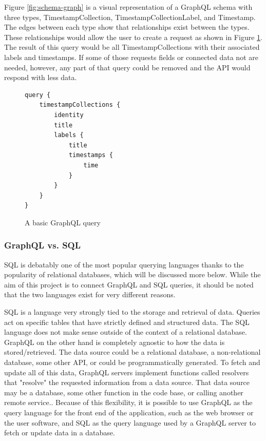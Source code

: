 Figure \ref{fig:schema-graph} is a visual representation of a GraphQL schema with three types, TimestampCollection, TimestampCollectionLabel, and Timestamp.  The edges between each type show that relationships exist between the types. These relationships  would allow the user to create a request as shown in Figure \ref{fig:basic-query}.  The result of this query would be all TimestampCollections with their associated labels and timestamps.  If some of those requests fields or connected data not are needed, however, any part of that query could be removed and the API would respond with less data.

\begin{figure}
    \begin{verbatim}
query {
    timestampCollections {
        identity
        title
        labels {
            title
            timestamps {
                time
            }
        }
    }
}
    \end{verbatim}
    \caption{A basic GraphQL query}
    \label{fig:basic-query}
\end{figure}

\subsubsection{GraphQL vs. SQL}

SQL is debatably one of the most popular querying languages thanks to the popularity of relational databases, which will be discussed more below.  While the aim of this project is to connect GraphQL and SQL queries, it should be noted that the two languages exist for very different reasons.

SQL is a language very strongly tied to the storage and retrieval of data.  Queries act on specific tables that have strictly defined and structured data.  The SQL language does not make sense outside of the context of a relational database.  GraphQL on the other hand is completely agnostic to how the data is stored/retrieved.  The data source could be a relational database, a non-relational database, some other API, or could be programmatically generated. To fetch and update all of this data, GraphQL servers implement functions called resolvers that "resolve" the requested information from a data source.  That data source may be a  database, some other function in the code base, or calling another remote service..  Because of this flexibility, it is possible to use GraphQL as the query language for the front end of the application, such as the web browser or the user software, and SQL as the query language used by a GraphQL server to fetch or update data in a database.